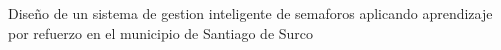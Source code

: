 \begin{center}
	\vspace*{10cm}
	{Diseño de un sistema de gestion inteligente de semaforos aplicando aprendizaje por refuerzo en el municipio de Santiago de Surco}
\end{center}
